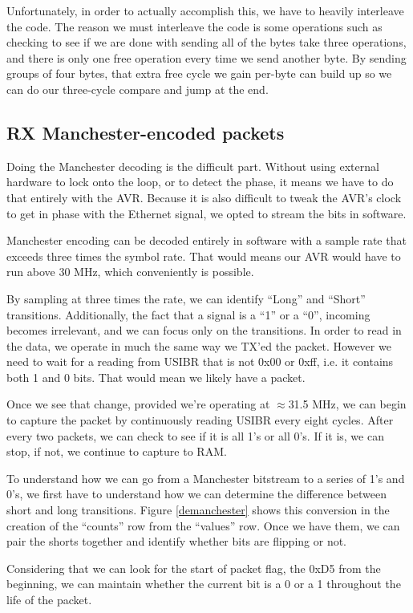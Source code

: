 \documentclass[13pt]{ltxdoc}
\begin{document}
Unfortunately, in order to actually accomplish this, we have to heavily interleave the code.  The 
reason we must interleave the code is some operations such as checking to see if we are done with
sending all of the bytes take three operations, and there is only one free operation every time
we send another byte.  By sending groups of four bytes, that extra free cycle we gain per-byte can build up so we can
do our three-cycle compare and jump at the end.  

\subsection{RX Manchester-encoded packets}
Doing the Manchester decoding is the difficult part.  Without using external hardware to lock onto
the loop, or to detect the phase, it means we have to do that entirely with the AVR.  Because it is
also difficult to tweak the AVR's clock to get in phase with the Ethernet signal, we opted to 
stream the bits in software.

Manchester encoding can be decoded entirely in software with a sample rate that exceeds three
times the symbol rate.  That would means our AVR would have to run above 30 MHz, which
conveniently is possible.

By sampling at three times the rate, we can identify ``Long'' and ``Short'' transitions.  Additionally,
the fact that a signal is a ``1'' or a ``0'', incoming becomes irrelevant, and we can focus only on
the transitions.  In order to read in the data, we operate in much the same way we TX'ed the packet.  However
we need to wait for a reading from USIBR that is not 0x00 or 0xff, i.e. it contains both 1 and 0 bits. That
would mean we likely have a packet.

Once we see that change, provided we're operating at $\approx$31.5 MHz, we can begin to capture the packet
by continuously reading USIBR every eight cycles.  After every two packets, we can check to see if
it is all 1's or all 0's.  If it is, we can stop, if not, we continue to capture to RAM.

To understand how we can go from a Manchester bitstream to a series of 1's and 0's, we first
have to understand how we can determine the difference between short and long transitions.  Figure
\ref{demanchester} shows this conversion in the creation of the ``counts'' row from the ``values'' row.
Once we have them, we can pair the shorts together and identify whether bits are flipping or not.

Considering that we can look for the start of packet flag, the 0xD5 from the beginning, we can maintain
whether the current bit is a 0 or a 1 throughout the life of the packet.
\end{document}
